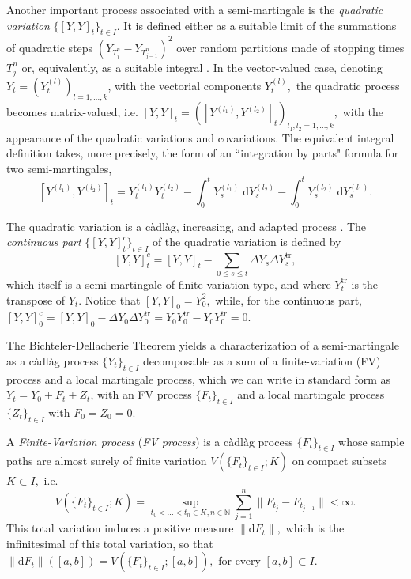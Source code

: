 \documentclass[reqno,12pt]{amsart}
\theoremstyle{plain} %
\theoremstyle{definition} %
\newcommand{\tr}{{\operatorname{tr}}}
\begin{document}
Another important process associated with a semi-martingale is the \emph{quadratic variation} $\{[Y, Y]_t\}_{t\in I}$. It is defined either as a suitable limit of the summations of quadratic steps $(Y_{T_j^n} - Y_{T_{j-1}^n})^2$ over random partitions made of stopping times $T_j^n$ or, equivalently, as a suitable integral \cite[Section II.6]{Protter2005}. In the vector-valued case, denoting $Y_t = (Y_t^{(l)})_{l=1, \ldots, k}$, with the vectorial components $Y_t^{(l)},$ the quadratic process becomes matrix-valued, i.e. $[Y, Y]_t = ([Y^{(l_1)}, Y^{(l_2)}]_t)_{l_1,l_2=1,\ldots, k},$ with the appearance of the quadratic variations and covariations. The equivalent integral definition takes, more precisely, the form of an ``integration by parts" formula for two semi-martingales,
\[
    [Y^{(l_1)}, Y^{(l_2)}]_t = Y_t^{(l_1)} Y_t^{(l_2)} - \int_0^t Y_{s^-}^{(l_1)} \;\mathrm{d}Y_s^{(l_2)} - \int_0^t Y_{s^-}^{(l_2)} \;\mathrm{d}Y_s^{(l_1)}.
\]

The quadratic variation is a c\`adl\`ag, increasing, and adapted process \cite[Theorem II.22]{Protter2005}. The \emph{continuous part} {$\{[Y, Y]_t^c\}_{t\in I}$} of the quadratic variation is defined by
\[
    [Y, Y]_t^c = [Y, Y]_t - \sum_{0\leq s \leq t} \Delta Y_s\Delta Y_s^\tr,
\]
which itself is a semi-martingale of finite-variation type, and where $Y_t^\tr$ is the transpose of $Y_t.$ Notice that $[Y, Y]_0 = Y_0^2,$ while, for the continuous part, $[Y, Y]_0^c = [Y, Y]_0 - \Delta Y_0\Delta Y_0^\tr = Y_0 Y_0^\tr - Y_0 Y_0^\tr = 0.$

The Bichteler-Dellacherie Theorem \cite[Theorem III.47]{Protter2005} yields a characterization of a semi-martingale as a c\`adl\`ag process $\{Y_t\}_{t\in I}$ decomposable as a sum of a finite-variation (FV) process and a local martingale process, which we can write in standard form as $Y_t = Y_0 + F_t + Z_t$, with an FV process $\{F_t\}_{t\in I}$ and a local martingale process $\{Z_t\}_{t\in I}$ with $F_0 = Z_0 = 0.$

A \emph{Finite-Variation process} (\emph{FV process}) is a c\`adl\`ag process $\{F_t\}_{t \in I}$ whose sample paths are almost surely of finite variation $V({\{F_t\}_{t\in I}}; K)$ on compact subsets $K\subset I,$ i.e.
\[ V(\{F_t\}_{t\in I}; K) = \sup_{t_0 < \ldots < t_n \in K, n\in \mathbb{N}} \sum_{j=1}^n \|F_{t_j} - F_{t_{j-1}}\| < \infty.
\]
This total variation induces a positive measure $\|\mathrm{d}F_t\|,$ which is the infinitesimal of this total variation, so that $\|\mathrm{d}F_t\|([a, b]) = V({\{F_t\}_{t\in I}}; [a, b]),$ for every $[a, b]\subset I.$
\end{document}
